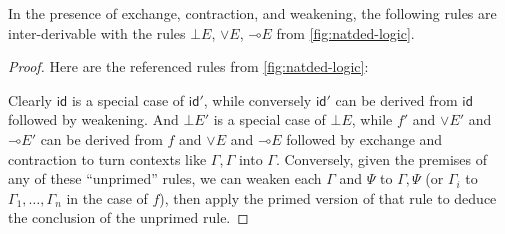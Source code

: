 \documentclass{book}
\def\idfunc{\mathsf{id}}
\let\types\vdash
\def\type{\;\ftype}
\let\join\vee
\def\joinE{\mathord{\join}E}
\let\hom\multimap
\def\homE{\mathord{\hom}E}
\begin{document}
\begin{lem}\label{thm:cart-constctx}
  In the presence of exchange, contraction, and weakening, the following rules are inter-derivable with the rules $\bot E$, $\joinE$, $\homE$ from \cref{fig:natded-logic}.
\end{lem}
\begin{proof}
  Here are the referenced rules from \cref{fig:natded-logic}:
  Clearly $\idfunc$ is a special case of $\idfunc'$, while conversely $\idfunc'$ can be derived from $\idfunc$ followed by weakening.
  And $\bot E'$ is a special case of $\bot E$, while $f'$ and $\joinE'$ and $\homE'$ can be derived from $f$ and $\joinE$ and $\homE$ followed by exchange and contraction to turn contexts like $\Gamma,\Gamma$ into $\Gamma$.
  Conversely, given the premises of any of these ``unprimed'' rules, we can weaken each $\Gamma$ and $\Psi$ to $\Gamma,\Psi$ (or $\Gamma_i$ to $\Gamma_1,\dots,\Gamma_n$ in the case of $f$), then apply the primed version of that rule to deduce the conclusion of the unprimed rule.
\end{proof}
\end{document}
